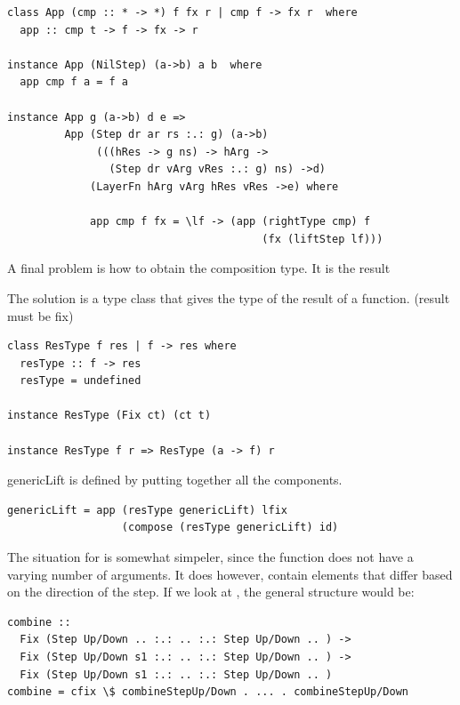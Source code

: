 \documentclass[preprint,natbib]{sigplanconf}
\begin{document}
\begin{small}
\begin{verbatim}
class App (cmp :: * -> *) f fx r | cmp f -> fx r  where
  app :: cmp t -> f -> fx -> r

instance App (NilStep) (a->b) a b  where
  app cmp f a = f a

instance App g (a->b) d e =>
         App (Step dr ar rs :.: g) (a->b) 
              (((hRes -> g ns) -> hArg -> 
                (Step dr vArg vRes :.: g) ns) ->d) 
             (LayerFn hArg vArg hRes vRes ->e) where
  
             app cmp f fx = \lf -> (app (rightType cmp) f
                                        (fx (liftStep lf))) 
\end{verbatim}
\end{small}

A final problem is how to obtain the composition type. It is the result 

The solution is a type class that gives the type of the result of a function. (result must be fix)

\begin{small}
\begin{verbatim}
class ResType f res | f -> res where
  resType :: f -> res
  resType = undefined

instance ResType (Fix ct) (ct t)
  
instance ResType f r => ResType (a -> f) r
\end{verbatim}
\end{small}

genericLift is defined by putting together all the components.
\begin{small}
\begin{verbatim}
genericLift = app (resType genericLift) lfix 
                  (compose (resType genericLift) id)
\end{verbatim}
\end{small}


The situation for  is somewhat simpeler, since the function does not have a varying number of arguments. It does however, contain elements that differ based on the direction of the step. If we look at , the general structure would be:

\begin{small}
\begin{verbatim}
combine :: 
  Fix (Step Up/Down .. :.: .. :.: Step Up/Down .. ) ->
  Fix (Step Up/Down s1 :.: .. :.: Step Up/Down .. ) ->
  Fix (Step Up/Down s1 :.: .. :.: Step Up/Down .. )
combine = cfix \$ combineStepUp/Down . ... . combineStepUp/Down 
\end{verbatim}%
\end{small}
\end{document}
